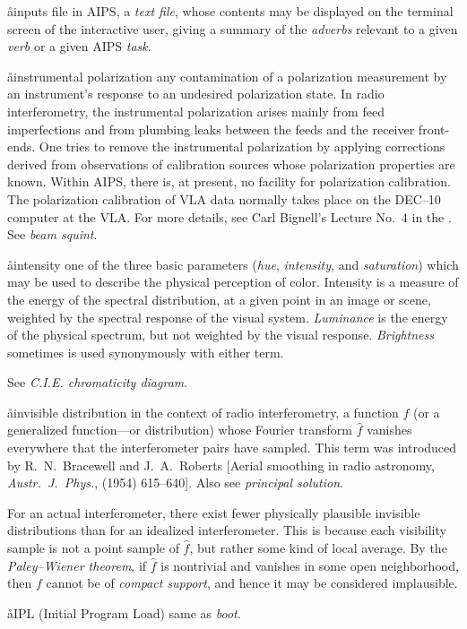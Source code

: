 \aa{inputs file}
in AIPS, a {\it text file}, whose contents may be displayed
on the terminal screen of the interactive user,
giving a summary of the {\it adverbs} relevant to a given
{\it verb} or a given AIPS {\it task}.

\aa{instrumental polarization}
any contamination of a polarization measurement
by an instrument's response to an undesired polarization state.
In radio interferometry, the instrumental polarization arises mainly from
feed imperfections and from plumbing leaks between the feeds
and the receiver front-ends.
One tries to remove the instrumental polarization by applying
corrections derived from observations of calibration sources
whose polarization properties are known.
Within AIPS, there is, at present, no facility for polarization calibration.
The polarization calibration of VLA data normally takes place on the
DEC--10 computer at the VLA.
For more details, see Carl Bignell's Lecture No.~4 in the \ssp.
See {\it beam squint}.

\aa{intensity}
one of the three basic parameters ({\it hue}, {\it intensity},
and {\it saturation}\/)
which may be used to describe the physical perception of color.
Intensity is a measure of the energy of the spectral distribution,
at a given point in an image or scene,
weighted by the spectral response of the visual system.
{\it Luminance} is the energy of the physical spectrum,
but not weighted by the visual response.
{\it Brightness} sometimes is used synonymously with either term.
\par
See {\it C.I.E. chromaticity diagram}.

\aa{invisible distribution}
in the context of radio interferometry,
a function $f$ (or a generalized function---or distribution)
whose Fourier transform $\hat f$ vanishes everywhere that the
interferometer pairs have sampled.
This term was introduced by R.~N.~Bracewell and J.~A.~Roberts
[Aerial smoothing in radio astronomy, {\it Austr.\ J.~Phys.},
 (1954) 615--640].
Also see {\it principal solution}.
\par
For an actual interferometer,
there exist fewer physically plausible invisible distributions
than for an idealized interferometer.
This is because each visibility sample is not a point sample
of $\hat f$, but rather some kind of local average.
By the {\it Paley--Wiener theorem}\/, if $\hat f$ is nontrivial and vanishes
in some open neighborhood, then $f$ cannot be of {\it compact support},
and hence it may be considered implausible.

\aa{IPL}
(Initial Program Load) same as {\it boot}.

